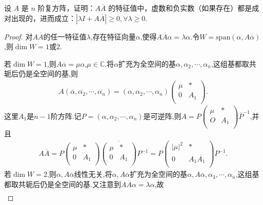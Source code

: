 \documentclass[../../main.tex]{subfiles}
\begin{document}
\begin{example}
设 $A$ 是 $n$ 阶复方阵，证明：$A\overline{A}$ 的特征值中，虚数和负实数（如果存在）都是成对出现的，进而成立：$|\lambda I + A\overline{A}| \geq 0, \forall \lambda \geq 0$.
\end{example}
\begin{proof}
对$A\overline{A}$的任一特征值$\lambda$,存在特征向量$\alpha$,使得$A\overline{A}\alpha =\lambda \alpha$.令$W=\mathrm{span}\left( \alpha ,A\overline{\alpha } \right)$,则$\dim W=1$或$2$.

若$\dim W=1$,则$A\overline{\alpha }=\mu \alpha$,$\mu \in \mathbb{C}$.将$\alpha$扩充为全空间的基$\alpha ,\alpha _2,\cdots ,\alpha _n$,这组基都取共轭后仍是全空间的基,则
\begin{align*}
A\left( \overline{\alpha },\overline{\alpha _2},\cdots ,\overline{\alpha _n} \right) =\left( \alpha ,\alpha _2,\cdots ,\alpha _n \right) \begin{pmatrix}
\mu&		*\\
0&		A_1\\
\end{pmatrix}.
\end{align*}
这里$A_1$是$n-1$阶方阵.记$P=\left( \alpha ,\alpha _2,\cdots ,\alpha _n \right)$是可逆阵,则$A=P\begin{pmatrix}
\mu&		*\\
O&		A_1\\
\end{pmatrix} \overline{P}^{-1}$,并且
\begin{align*}
A\overline{A}=P\begin{pmatrix}
\mu&		*\\
0&		A_1\\
\end{pmatrix} \overline{\begin{pmatrix}
\mu&		*\\
0&		A_1\\
\end{pmatrix} }P^{-1}=P\begin{pmatrix}
\left| \mu \right|^2&		*\\
0&		A_1\overline{A_1}\\
\end{pmatrix} P^{-1}.
\end{align*}
若$\dim W=2$,则$\alpha ,A\overline{\alpha }$线性无关,将$\alpha ,A\overline{\alpha }$扩充为全空间的基$\alpha ,A\overline{\alpha },\alpha _3,\cdots ,\alpha _n$,这组基都取共轭后仍是全空间的基.又注意到$A\overline{A}\alpha =\lambda \alpha$,故
\begin{align*}

\end{align*}
\end{proof}
\end{document}
